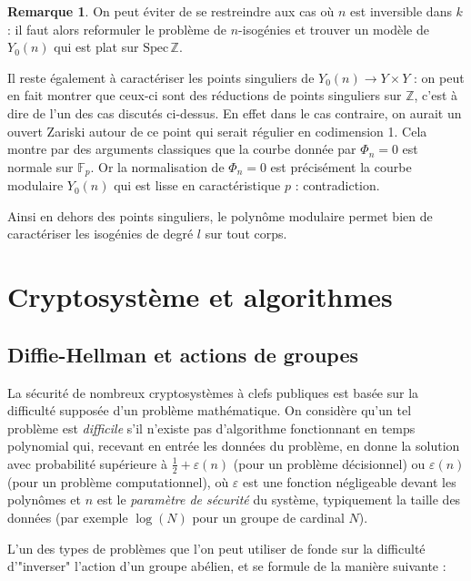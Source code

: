 \documentclass[11pt,a4paper]{article}
\newcommand{\Z}{\mathbb{Z}}
\newcommand{\F}{\mathbb{F}}
\newcommand{\vers}{\rightarrow}
\newcommand{\Spec}{\mathrm{Spec}\,}
\theoremstyle{definition}
\newtheorem*{rem}{Remarque}
\begin{document}
\begin{rem}

On peut éviter de se restreindre aux cas où $n$ est inversible dans $k$ : il faut alors reformuler le problème de $n$-isogénies et trouver un modèle de $Y_0(n)$ qui est plat sur $\Spec\Z$.

\end{rem}

Il reste également à caractériser les points singuliers de $Y_0(n)\vers Y\times Y$ : on peut en fait montrer que ceux-ci sont des réductions de points singuliers sur $\Z$, c'est à dire de l'un des cas discutés ci-dessus. En effet dans le cas contraire, on aurait un ouvert Zariski autour de ce point qui serait régulier en codimension 1. Cela montre par des arguments classiques que la courbe donnée par $\Phi_n=0$ est normale sur $\F_p$. Or la normalisation de $\Phi_n=0$ est précisément la courbe modulaire $Y_0(n)$ qui est lisse en caractéristique $p$ : contradiction.

Ainsi en dehors des points singuliers, le polynôme modulaire permet bien de caractériser les isogénies de degré $l$ sur tout corps.

\newpage

\section{Cryptosystème et algorithmes}



\subsection{Diffie-Hellman et actions de groupes}


La sécurité de nombreux cryptosystèmes à clefs publiques est basée sur la difficulté supposée d'un problème mathématique. On considère qu'un tel problème est \emph{difficile} s'il n'existe pas d'algorithme fonctionnant en temps polynomial qui, recevant en entrée les données du problème, en donne la solution avec probabilité supérieure à $\frac{1}{2}+\varepsilon(n)$ (pour un problème décisionnel) ou $\varepsilon(n)$ (pour un problème computationnel), où $\varepsilon$ est une fonction négligeable devant les polynômes et $n$ est le \emph{paramètre de sécurité} du système, typiquement la taille des données (par exemple $\log(N)$ pour un groupe de cardinal $N$).

L'un des types de problèmes que l'on peut utiliser de fonde sur la difficulté d'"inverser" l'action d'un groupe abélien, et se formule de la manière suivante :
\end{document}
